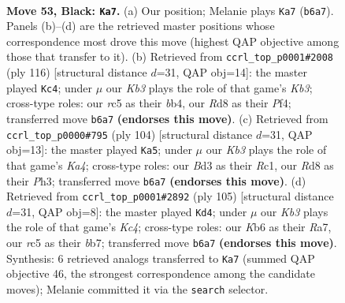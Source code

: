 \documentclass[11pt]{article}
\begin{document}
\clearpage

\begin{figure}[p]\centering
\begin{subfigure}{0.46\textwidth}\centering
\resizebox{\linewidth}{!}{%
\newchessgame
\chessboard[
  setfen={3r4/8/1k6/2RB1p1N/1P6/3b1N2/1K4P1/8 b - - 3 53},
  showmover=false,
  pgfstyle=straightmove, color=movearrow, markmove={b6-a7}
]}
\caption{}
\end{subfigure}\hfill
\begin{subfigure}{0.46\textwidth}\centering
\resizebox{\linewidth}{!}{%
\newchessgame
\chessboard[
  setfen={8/1B4B1/4k3/p6p/1b3P2/1K5P/8/5n2 w - - 4 59},
  showmover=false,
  pgfstyle=straightmove, color=movearrow, markmove={b3-c4}
]}
\caption{}
\end{subfigure}
\\[4pt]
\begin{subfigure}{0.46\textwidth}\centering
\resizebox{\linewidth}{!}{%
\newchessgame
\chessboard[
  setfen={8/1r6/p5Np/1n6/K2k2P1/7P/8/2R5 w - - 4 53},
  showmover=false,
  pgfstyle=straightmove, color=movearrow, markmove={a4-a5}
]}
\caption{}
\end{subfigure}\hfill
\begin{subfigure}{0.46\textwidth}\centering
\resizebox{\linewidth}{!}{%
\newchessgame
\chessboard[
  setfen={8/rB6/8/2k5/7p/6bP/4K1P1/1R6 b - - 1 53},
  showmover=false,
  pgfstyle=straightmove, color=movearrow, markmove={c5-d4}
]}
\caption{}
\end{subfigure}
\caption{\textbf{Move 53, Black: \texttt{Ka7}.} (a) Our position; Melanie plays \texttt{Ka7} (\texttt{b6a7}). Panels (b)--(d) are the retrieved master positions whose correspondence most drove this move (highest QAP objective among those that transfer to it). (b) Retrieved from \texttt{ccrl\_top\_p0001\#2008} (ply 116) [structural distance $d$=31, QAP obj=14]: the master played \texttt{Kc4}; under $\mu$ our \emph{Kb3} plays the role of that game's \emph{Kb3}; cross-type roles: our \emph{r}c5 as their \emph{b}b4, our \emph{R}d8 as their \emph{P}f4; transferred move \texttt{b6a7} \textbf{(endorses this move)}. (c) Retrieved from \texttt{ccrl\_top\_p0000\#795} (ply 104) [structural distance $d$=31, QAP obj=13]: the master played \texttt{Ka5}; under $\mu$ our \emph{Kb3} plays the role of that game's \emph{Ka4}; cross-type roles: our \emph{B}d3 as their \emph{R}c1, our \emph{R}d8 as their \emph{P}h3; transferred move \texttt{b6a7} \textbf{(endorses this move)}. (d) Retrieved from \texttt{ccrl\_top\_p0001\#2892} (ply 105) [structural distance $d$=31, QAP obj=8]: the master played \texttt{Kd4}; under $\mu$ our \emph{Kb3} plays the role of that game's \emph{Kc4}; cross-type roles: our \emph{K}b6 as their \emph{R}a7, our \emph{r}c5 as their \emph{b}b7; transferred move \texttt{b6a7} \textbf{(endorses this move)}. Synthesis: 6 retrieved analogs transferred to \texttt{Ka7} (summed QAP objective 46, the strongest correspondence among the candidate moves); Melanie committed it via the \texttt{search} selector.}
\label{fig:thought-m105}
\end{figure}
\end{document}
